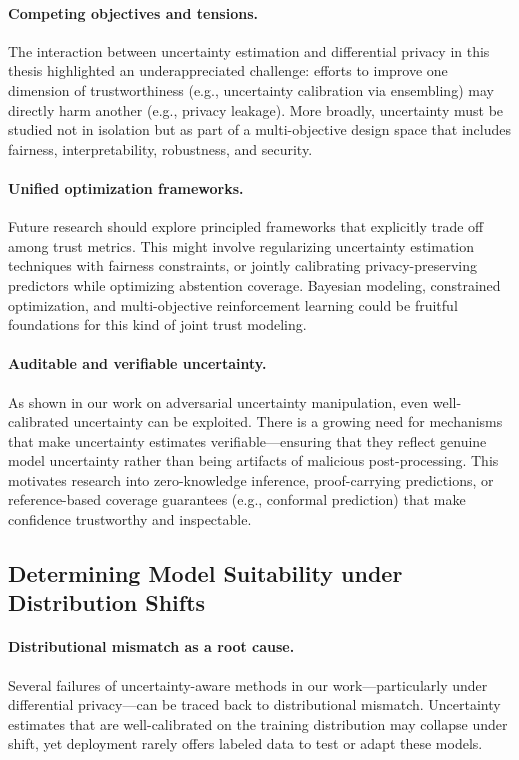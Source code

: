 \paragraph{Competing objectives and tensions.} The interaction between uncertainty estimation and differential privacy in this thesis highlighted an underappreciated challenge: efforts to improve one dimension of trustworthiness (e.g., uncertainty calibration via ensembling) may directly harm another (e.g., privacy leakage). More broadly, uncertainty must be studied not in isolation but as part of a multi-objective design space that includes fairness, interpretability, robustness, and security.

\paragraph{Unified optimization frameworks.} Future research should explore principled frameworks that explicitly trade off among trust metrics. This might involve regularizing uncertainty estimation techniques with fairness constraints, or jointly calibrating privacy-preserving predictors while optimizing abstention coverage. Bayesian modeling, constrained optimization, and multi-objective reinforcement learning could be fruitful foundations for this kind of joint trust modeling.

\paragraph{Auditable and verifiable uncertainty.} As shown in our work on adversarial uncertainty manipulation, even well-calibrated uncertainty can be exploited. There is a growing need for mechanisms that make uncertainty estimates verifiable—ensuring that they reflect genuine model uncertainty rather than being artifacts of malicious post-processing. This motivates research into zero-knowledge inference, proof-carrying predictions, or reference-based coverage guarantees (e.g., conformal prediction) that make confidence trustworthy and inspectable.

\subsection{Determining Model Suitability under Distribution Shifts}

\paragraph{Distributional mismatch as a root cause.} Several failures of uncertainty-aware methods in our work—particularly under differential privacy—can be traced back to distributional mismatch. Uncertainty estimates that are well-calibrated on the training distribution may collapse under shift, yet deployment rarely offers labeled data to test or adapt these models.

